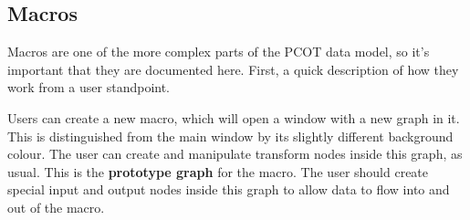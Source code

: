 \subsection{Macros}
\label{macros}
Macros are one of the more complex parts of the PCOT data model, so it's
important that they are documented here. First, a quick description
of how they work from a user standpoint.

Users can create a new macro, which will open a window with a new graph in it.
This is distinguished from the main window by its slightly different
background colour. The user can create and manipulate transform nodes inside
this graph, as usual. This is the \textbf{prototype graph} for the macro.
The user should create special input and output nodes inside this graph
to allow data to flow into and out of the macro.

